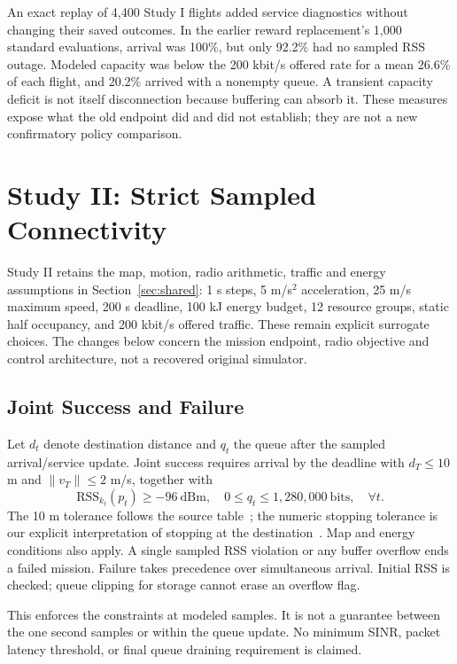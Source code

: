\documentclass[conference]{IEEEtran}
\begin{document}
An exact replay of 4,400 Study I flights added service diagnostics without
changing their saved outcomes. In the earlier reward replacement's 1,000
standard evaluations, arrival was 100\%, but only 92.2\% had no sampled RSS
outage. Modeled capacity was below the 200 kbit/s offered rate for a mean
26.6\% of each flight, and 20.2\% arrived with a nonempty queue. A transient
capacity deficit is not itself disconnection because buffering can absorb it.
These measures expose what the old endpoint did and did not establish; they
are not a new confirmatory policy comparison.

\section{Study II: Strict Sampled Connectivity}
\label{sec:joint}
Study II retains the map, motion, radio arithmetic, traffic and energy
assumptions in Section~\ref{sec:shared}: 1 s steps, 5 m/s$^2$ acceleration,
25 m/s maximum speed, 200 s deadline, 100 kJ energy budget, 12 resource groups,
static half occupancy, and 200 kbit/s offered traffic. These remain explicit
surrogate choices. The changes below concern the mission endpoint, radio
objective and control architecture, not a recovered original simulator.

\subsection{Joint Success and Failure}
Let $d_t$ denote destination distance and $q_t$ the queue after the sampled
arrival/service update. Joint success requires arrival by the deadline with
$d_T\leq10$ m and $\|v_T\|\leq2$ m/s, together with
\begin{equation}
\mathrm{RSS}_{k_t}(p_t)\geq-96\ \mathrm{dBm},\quad
0\leq q_t\leq1{,}280{,}000\ \mathrm{bits},\quad\forall t.
\end{equation}
The 10 m tolerance follows the source table~\cite[p.~15, Table~3]{thesis}; the
numeric stopping tolerance is our explicit interpretation of stopping at the
destination~\cite[p.~9, Sec.~3.2]{thesis}. Map and energy conditions also apply.
A single sampled RSS violation or any buffer overflow ends a failed mission.
Failure takes precedence over simultaneous arrival. Initial RSS is checked;
queue clipping for storage cannot erase an overflow flag.

This enforces the constraints at modeled samples. It is not a guarantee
between the one second samples or within the queue update. No minimum SINR,
packet latency threshold, or final queue draining requirement is claimed.
\end{document}
